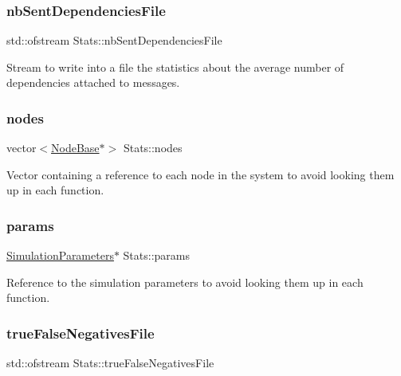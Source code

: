 \subsubsection{\texorpdfstring{nb\+Sent\+Dependencies\+File}{nbSentDependenciesFile}}
{\footnotesize\ttfamily std\+::ofstream Stats\+::nb\+Sent\+Dependencies\+File\hspace{0.3cm}{\ttfamily [private]}}



Stream to write into a file the statistics about the average number of dependencies attached to messages. 

\mbox{\label{class_stats_a815a3aa12c1529fe3d686038a2094fb2}} 
\subsubsection{\texorpdfstring{nodes}{nodes}}
{\footnotesize\ttfamily vector$<$\hyperlink{class_node_base}{Node\+Base}$\ast$$>$ Stats\+::nodes\hspace{0.3cm}{\ttfamily [private]}}



Vector containing a reference to each node in the system to avoid looking them up in each function. 

\mbox{\label{class_stats_aec7570f722a5a0c6ed5f6b7208331dc1}} 
\subsubsection{\texorpdfstring{params}{params}}
{\footnotesize\ttfamily \hyperlink{class_simulation_parameters}{Simulation\+Parameters}$\ast$ Stats\+::params\hspace{0.3cm}{\ttfamily [private]}}



Reference to the simulation parameters to avoid looking them up in each function. 

\mbox{\label{class_stats_ac9e180c84874fabd361396f3c9a166ae}} 
\subsubsection{\texorpdfstring{true\+False\+Negatives\+File}{trueFalseNegativesFile}}
{\footnotesize\ttfamily std\+::ofstream Stats\+::true\+False\+Negatives\+File\hspace{0.3cm}{\ttfamily [private]}}



